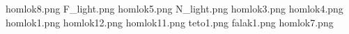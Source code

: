 homlok8.png
F_light.png
homlok5.png
N_light.png
homlok3.png
homlok4.png
homlok1.png
homlok12.png
homlok11.png
teto1.png
falak1.png
homlok7.png
